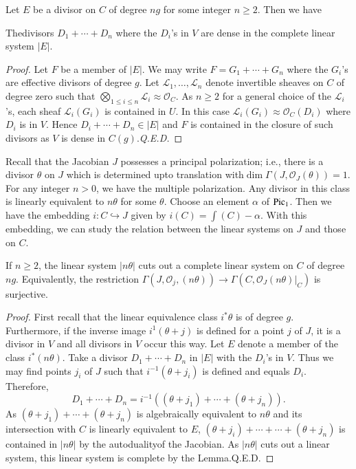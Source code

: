 Let $E$ be a divisor on $C$ of degree $ng$ for some integer $n\geq
2$. Then we have 

\begin{lemma*}
The\pageoriginale divisors $D_{1}+\cdots+D_{n}$ where the $D_{i}$'s in
$V$ are dense in the complete linear system $|E|$.
\end{lemma*}

\begin{proof}
Let $F$ be a member of $|E|$. We may write $F=G_{1}+\cdots+G_{n}$
where the $G_{i}$'s are effective divisors of degree $g$. Let
$\mathscr{L}_{1},\ldots,\mathscr{L}_{n}$ denote invertible sheaves on
$C$ of degree zero such that $\bigotimes\limits_{1\leq i\leq
n}\mathscr{L}_{i}\approx \mathscr{O}_{C}$. As $n\geq 2$ for a general
choice of the $\mathscr{L}_{i}$'s, each sheaf $\mathscr{L}_{i}(G_{i})$
is contained in $U$. In this case
$\mathscr{L}_{i}(G_{i})\approx \mathscr{O}_{C}(D_{i})$ where $D_{i}$
is in $V$. Hence $D_{i}+\cdots+D_{n}\in |E|$ and $F$ is contained in
the closure of such divisors as $V$ is dense in $C(g)$.\hfill {\em Q.E.D.}
\end{proof}

Recall that the Jacobian $J$ possesses a principal polarization; i.e.,
there is a divisor $\theta$ on $J$ which is determined upto
translation with\break $\dim \Gamma(J,\mathscr{O}_{J}(\theta))=1$. For any
integer $n>0$, we have the multiple polarization. Any divisor in this
class is linearly equivalent to $n\theta$ for some $\theta$. Choose an
element $\alpha$ of $\operatorname{Pic}_{1}$. Then we have the embedding
$i:C\hookrightarrow J$ given by $i(C)=\int (C)-\alpha$. With this
embedding, we can study the relation between the linear systems on $J$
and those on $C$.

\begin{prop*}
If $n\geq 2$, the linear system $|n\theta|$ cuts out a complete linear
system on $C$ of degree $ng$. Equivalently, the restriction
$\Gamma(J,\mathscr{O}_{j},(n\theta))\to \Gamma(C,\mathscr{O}_{J}(n\theta)|_{C})$
is surjective.
\end{prop*}

\begin{proof}
First recall \cite[for instance]{chap8-key4} that the linear
equivalence class $i^{\ast}\theta$ is of degree $g$. Furthermore, if
the inverse image $i^{1}(\theta+j)$ is defined for a point $j$ of $J$,
it is a divisor in $V$ and all divisors in $V$ occur this way. Let $E$
denote a member of the class $i^{*}(n\theta)$. Take a divisor
$D_{1}+\cdots+D_{n}$ in $|E|$ with the $D_{i}$'s in $V$. Thus we may
find points $j_{i}$ of $J$ such that $i^{-1}(\theta+j_{i})$ is defined
and equals $D_{i}$. Therefore,
$$
D_{1}+\cdots+D_{n}=i^{-1}((\theta+j_{1})+\cdots+(\theta+j_{n})).
$$
As $(\theta+j_{1})+\cdots+(\theta+j_{n})$ is algebraically equivalent
to $n\theta$ and its intersection with $C$ is linearly equivalent to
$E$, $(\theta+j_{i})+\cdots+\cdots+(\theta+j_{n})$ is contained in
$|n\theta|$ by the autoduality\pageoriginale of the Jacobian. As
$|n\theta|$ cuts out a linear system, this linear system is complete
by the Lemma.\hfill Q.E.D.
\end{proof}


